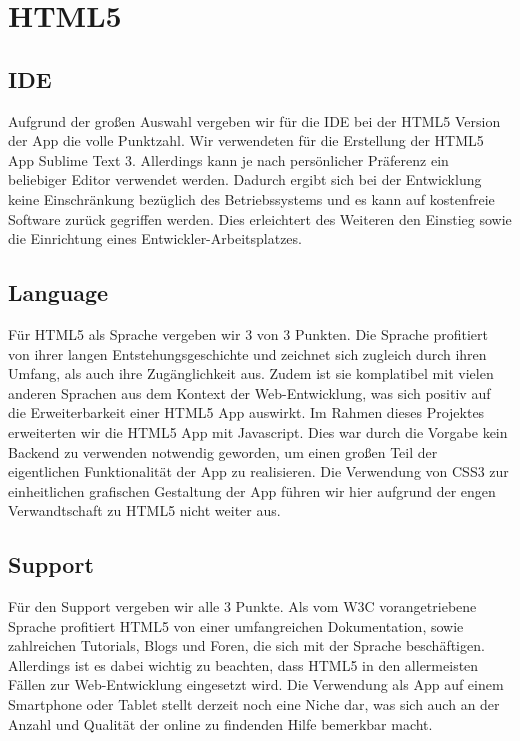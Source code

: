 \section{HTML5}

\subsection{IDE}
Aufgrund der großen Auswahl vergeben wir für die IDE bei der HTML5 Version der App die volle Punktzahl. Wir verwendeten für die Erstellung der HTML5 App Sublime Text 3. Allerdings kann je nach persönlicher Präferenz ein beliebiger Editor verwendet werden. Dadurch ergibt sich bei der Entwicklung keine Einschränkung bezüglich des Betriebssystems und es kann auf kostenfreie Software zurück gegriffen werden. Dies erleichtert des Weiteren den Einstieg sowie die Einrichtung eines Entwickler-Arbeitsplatzes.

\subsection{Language}
Für HTML5 als Sprache vergeben wir 3 von 3 Punkten. Die Sprache profitiert von ihrer langen Entstehungsgeschichte und zeichnet sich zugleich durch ihren Umfang, als auch ihre Zugänglichkeit aus. Zudem ist sie komplatibel mit vielen anderen Sprachen aus dem Kontext der Web-Entwicklung, was sich positiv auf die Erweiterbarkeit einer HTML5 App auswirkt. Im Rahmen dieses Projektes erweiterten wir die HTML5 App mit Javascript. Dies war durch die Vorgabe kein Backend zu verwenden notwendig geworden, um einen großen Teil der eigentlichen Funktionalität der App zu realisieren. Die Verwendung von CSS3 zur einheitlichen grafischen Gestaltung der App führen wir hier aufgrund der engen Verwandtschaft zu HTML5 nicht weiter aus.

\subsection{Support}
Für den Support vergeben wir alle 3 Punkte. Als vom W3C vorangetriebene Sprache profitiert HTML5 von einer umfangreichen Dokumentation, sowie zahlreichen Tutorials, Blogs und Foren, die sich mit der Sprache beschäftigen. Allerdings ist es dabei wichtig zu beachten, dass HTML5 in den allermeisten Fällen zur Web-Entwicklung eingesetzt wird. Die Verwendung als App auf einem Smartphone oder Tablet stellt derzeit noch eine Niche dar, was sich auch an der Anzahl und Qualität der online zu findenden Hilfe bemerkbar macht.


